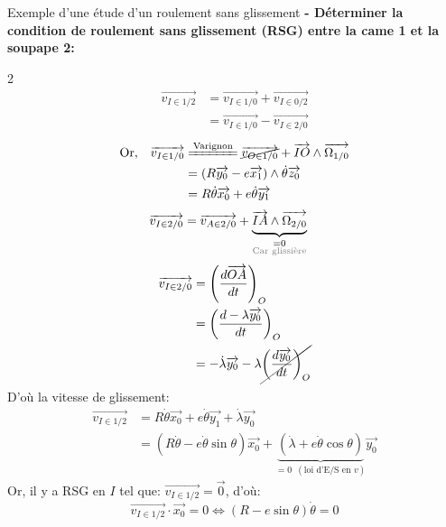 \documentclass{article} %
\begin{document}
{\begin{exemple}{Exemple d'une étude d'un roulement sans glissement}
\textbf{- Déterminer la condition de roulement sans glissement (RSG) entre la came 1 et la soupape 2:}\vspace{-10pt}\\
\begin{multicols}{2}
\begin{align*}
\overrightarrow{v_{I\in1/2}} &= \overrightarrow{v_{I\in1/0}} + \overrightarrow{v_{I\in0/2}} \\
&= \overrightarrow{v_{I\in1/0}} - \overrightarrow{v_{I\in2/0}}
\end{align*}
\begin{align*}
\text{{Or,}} \quad \overrightarrow{v_{I\in1/0}} &\xeq{\textrm{Varignon}} \cancel{\overrightarrow{v_{O\in1/0}}} + \overrightarrow{IO} \wedge \overrightarrow{\Omega_{1/0}} \\
&= (R\overrightarrow{y_0} - e\overrightarrow{x_1}) \wedge \dot{\theta}\overrightarrow{z_0} \\
&= R\dot{\theta}\overrightarrow{x_0} + e\dot{\theta}\overrightarrow{y_1}
\end{align*}
\begin{align*}
\overrightarrow{v_{I\in2/0}} &= \overrightarrow{v_{A\in2/0}} + \underbrace{\overrightarrow{IA} \wedge \overrightarrow{\Omega_{2/0}}}_{\substack{=0 \\ \textcolor{gray}{\text{\scriptsize Car glissi\`ere}}}}
\end{align*}
\columnbreak
\begin{align*}
\overrightarrow{v_{I\in2/0}}&= \left( \frac{d\overrightarrow{OA}}{dt} \right)_O \\
&= \left( \frac{d-\lambda\overrightarrow{y_0}}{dt} \right)_O \\
&= -\dot{\lambda}\overrightarrow{y_0} - \lambda\cancel{\left( \frac{d\overrightarrow{y_0}}{dt} \right)_O}
\end{align*}
\noindent D'où la vitesse de glissement:
\begin{align*}
\overrightarrow{v_{I\in1/2}} &= R\dot{\theta}\overrightarrow{x_0} + e\dot{\theta}\overrightarrow{y_1} + \dot{\lambda}\overrightarrow{y_0} \\
&= (R\dot{\theta} - e\dot{\theta}\sin\theta)\overrightarrow{x_0} + \underbrace{(\dot{\lambda} + e\dot{\theta}\cos\theta)}_{=0\phantom{k}(\textrm{loi d'E/S en }v)}\overrightarrow{y_0}
\end{align*}
\noindent Or, il y a RSG en $I$ tel que: $\overrightarrow{v_{I\in1/2}} = \overrightarrow{0}$, d'où:
$$\overrightarrow{v_{I\in1/2}} \cdot \overrightarrow{x_0} = 0 \iff \boxed{(R - e\sin\theta)\dot{\theta} = 0}$$

\end{multicols}
\end{exemple}}
\end{document}
